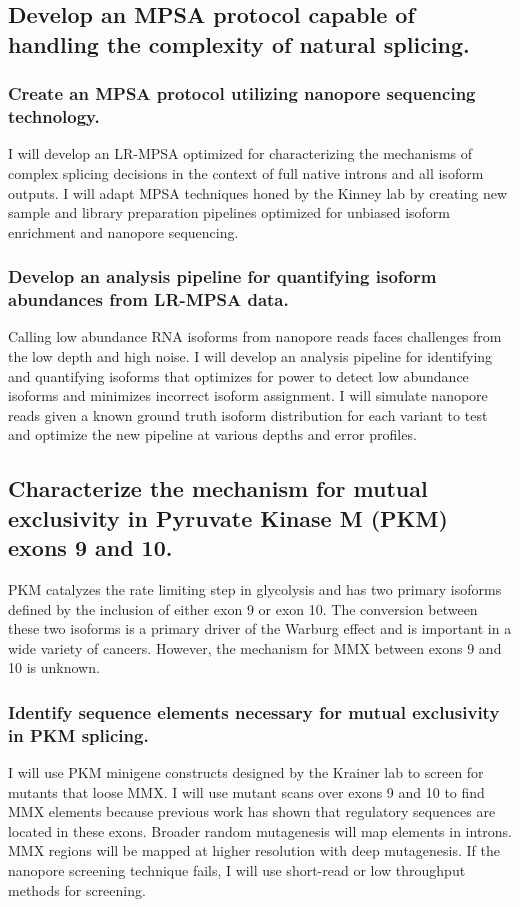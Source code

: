 \documentclass[11pt]{article}
\begin{document}
\subsection{Develop an MPSA protocol capable of handling the complexity of natural splicing.} \label{aim:MPSA_dev}
%
\subsubsection{Create an MPSA protocol utilizing nanopore sequencing technology.} \label{aim:nanopore_screen_dev}
I will develop an LR-MPSA optimized for characterizing the mechanisms of complex splicing decisions in the context of full native introns and all isoform outputs.
I will adapt MPSA techniques honed by the Kinney lab\supercite{Wong2018-vq,Ishigami2022-bf} by creating new sample and library preparation pipelines optimized for unbiased isoform enrichment and nanopore sequencing.
%
\subsubsection{Develop an analysis pipeline for quantifying isoform abundances from LR-MPSA data.} \label{aim:pipeline_dev}
Calling low abundance RNA isoforms from nanopore reads faces challenges from the low depth and high noise.
I will develop an analysis pipeline for identifying and quantifying isoforms that optimizes for power to detect low abundance isoforms and minimizes incorrect isoform assignment.
I will simulate nanopore reads given a known ground truth isoform distribution for each variant to test and optimize the new pipeline at various depths and error profiles.
%
\subsection{Characterize the mechanism for mutual exclusivity in Pyruvate Kinase M (PKM) exons 9 and 10.}
PKM catalyzes the rate limiting step in glycolysis and has two primary isoforms defined by the inclusion of either exon 9 or exon 10. 
The conversion between these two isoforms is a primary driver of the Warburg effect and is important in a wide variety of cancers.\supercite{Christofk2008-bu,Ma2022-dt} 
However, the mechanism for MMX between exons 9 and 10 is unknown.
%
\subsubsection{Identify sequence elements necessary for mutual exclusivity in PKM splicing.} \label{aim:PKM_motif_finding}
I will use PKM minigene constructs designed by the Krainer lab \supercite{Wang2012-dr} to screen for mutants that loose MMX.
I will use mutant scans over exons 9 and 10 to find MMX elements because previous work has shown that regulatory sequences are located in these exons.\supercite{Wang2012-dr} 
Broader random mutagenesis will map elements in introns.
MMX regions will be mapped at higher resolution with deep mutagenesis.
If the nanopore screening technique fails, I will use short-read or low throughput methods for screening.
%
\end{document}
